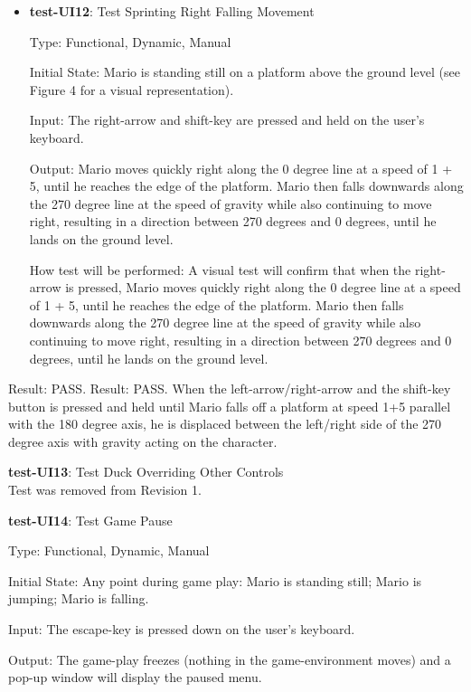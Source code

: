 \documentclass[12pt, titlepage]{article}
\begin{document}
\begin{enumerate}
\begin{itemize}
\item{\textbf{test-UI12}: Test Sprinting Right Falling Movement\\}

Type: Functional, Dynamic, Manual
					
Initial State: Mario is standing still on a platform above the ground level (see Figure 4 for a visual representation).
					
Input: The right-arrow and shift-key are pressed and held on the user's keyboard.
					
Output: Mario moves quickly right along the 0 degree line at a speed of 1 + 5, until he reaches the edge of the platform. Mario then falls downwards along the 270 degree line at the speed of gravity while also continuing to move right, resulting in a direction between 270 degrees and 0 degrees, until he lands on the ground level.
					
How test will be performed: A visual test will confirm that when the right-arrow is pressed, Mario moves quickly right along the 0 degree line at a speed of 1 + 5, until he reaches the edge of the platform. Mario then falls downwards along the 270 degree line at the speed of gravity while also continuing to move right, resulting in a direction between 270 degrees and 0 degrees, until he lands on the ground level.

\end{itemize}

Result: PASS. Result: PASS.  When the left-arrow/right-arrow and the shift-key button is pressed and held until Mario falls off a platform at speed 1+5 parallel with the 180 degree axis, he is displaced between the left/right side of the 270 degree axis with gravity acting on the character.

\item{\textbf{test-UI13}: Test Duck Overriding Other Controls\\

Test was removed from Revision 1.

\item{\textbf{test-UI14}: Test Game Pause\\}

Type: Functional, Dynamic, Manual
					
Initial State: Any point during game play: Mario is standing still; Mario is jumping; Mario is falling.
					
Input: The escape-key is pressed down on the user's keyboard.
					
Output: The game-play freezes (nothing in the game-environment moves) and a pop-up window will display the paused menu.
					
}
\end{enumerate}
\end{document}
